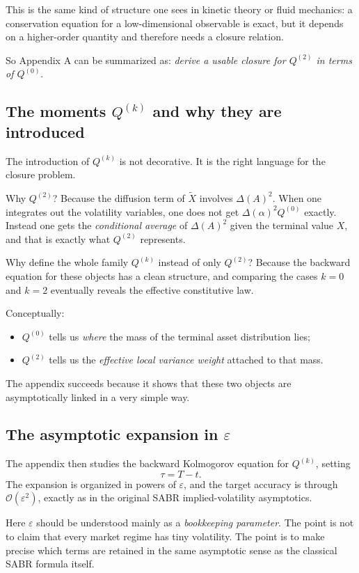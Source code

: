 \documentclass[11pt]{article}
\newcommand{\eps}{\varepsilon}
\newcommand{\X}{\widetilde{X}}
\newcommand{\Order}[1]{\mathcal{O}\!\left(#1\right)}
\begin{document}
This is the same kind of structure one sees in kinetic theory or fluid mechanics: a conservation equation for a low-dimensional observable is exact, but it depends on a higher-order quantity and therefore needs a closure relation.

So Appendix A can be summarized as: \emph{derive a usable closure for \(Q^{(2)}\) in terms of \(Q^{(0)}\)}.

\subsection{The moments \(Q^{(k)}\) and why they are introduced}

The introduction of \(Q^{(k)}\) is not decorative. It is the right language for the closure problem.

Why \(Q^{(2)}\)? Because the diffusion term of \(\X\) involves \(\Delta(A)^2\). When one integrates out the volatility variables, one does not get \(\Delta(\alpha)^2 Q^{(0)}\) exactly. Instead one gets the \emph{conditional average} of \(\Delta(A)^2\) given the terminal value \(X\), and that is exactly what \(Q^{(2)}\) represents.

Why define the whole family \(Q^{(k)}\) instead of only \(Q^{(2)}\)? Because the backward equation for these objects has a clean structure, and comparing the cases \(k=0\) and \(k=2\) eventually reveals the effective constitutive law.

Conceptually:
\begin{itemize}
    \item \(Q^{(0)}\) tells us \emph{where} the mass of the terminal asset distribution lies;
    \item \(Q^{(2)}\) tells us the \emph{effective local variance weight} attached to that mass.
\end{itemize}
The appendix succeeds because it shows that these two objects are asymptotically linked in a very simple way.

\subsection{The asymptotic expansion in \(\eps\)}

The appendix then studies the backward Kolmogorov equation for \(Q^{(k)}\), setting
\[
\tau=T-t.
\]
The expansion is organized in powers of \(\eps\), and the target accuracy is through \(\Order{\eps^2}\), exactly as in the original SABR implied-volatility asymptotics.

Here \(\eps\) should be understood mainly as a \emph{bookkeeping parameter}. The point is not to claim that every market regime has tiny volatility. The point is to make precise which terms are retained in the same asymptotic sense as the classical SABR formula itself.
\end{document}
